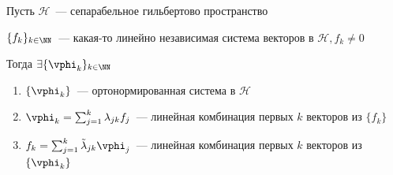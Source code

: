 \begin{Theorem}{}{}
	Пусть $\mathcal{H}$~--- сепарабельное гильбертово пространство
	
	$\{ f_k\}_{k \in \NN}$~--- какая-то линейно независимая система векторов в $ \mathcal{H},  f_k \neq 0$
	
	Тогда $ \exists  \{ \vphi_k\}_{k \in \NN}$
	
	\begin{enumerate}
		\item $\{ \vphi_k\}$~--- ортонормированная система в $\mathcal{H}$
		\item $\vphi_k = \sum_{j=1}^k \lambda_{jk} f_j$~--- линейная комбинация первых $k$ векторов из $\{ f_k\}$
		\item $f_k = \sum _{j=1}^k \tilde{\lambda}_{jk} \vphi_j$~--- линейная комбинация первых $k$ векторов из $\{ \vphi_k \}$
	\end{enumerate}
\end{Theorem}


